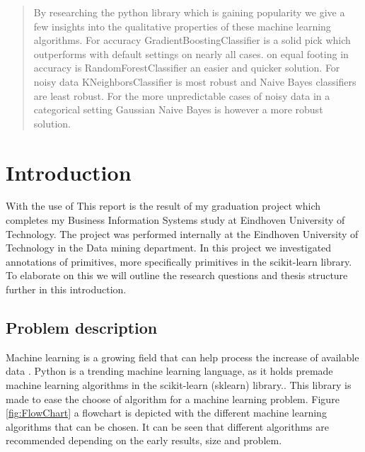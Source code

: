 \documentclass[a4paper,10pt]{article}
\begin{document}
\begin{abstract}
 By researching the python library which is gaining popularity we give a few insights into the qualitative properties of these machine learning algorithms. For accuracy GradientBoostingClassifier is a solid pick which outperforms with default settings on nearly all cases. on equal footing in accuracy is RandomForestClassifier an easier and quicker solution. For noisy data KNeighborsClassifier is most robust and Naive Bayes classifiers are least robust. For the more unpredictable cases of noisy data in a categorical setting Gaussian Naive Bayes is however a more robust solution.

\end{abstract}

\newpage
\tableofcontents
\newpage


\section{Introduction} \label{Chapter1}
With the use of 
This report is the result of my graduation project which completes my Business Information Systems study at Eindhoven University of Technology.
The project was performed internally at the Eindhoven University of Technology in the Data mining department.
In this project we investigated annotations of primitives, more specifically primitives in the scikit-learn library.
To elaborate on this we will outline the research questions and thesis structure further in this introduction.
 

\subsection{Problem description}\label{Intr-Prob}
Machine learning is a growing field that can help process the increase of available data \cite{Big-data}\cite{ML-trends}. Python is a trending machine learning language, as it holds premade machine learning algorithms in the scikit-learn (sklearn) library.\cite{python-pop}. This library is made to ease the choose of algorithm for a machine learning problem. Figure \ref{fig:FlowChart} a flowchart is depicted with the different machine learning algorithms that can be chosen. It can be seen that different algorithms are recommended depending on the early results, size and problem.
 
\end{document}
